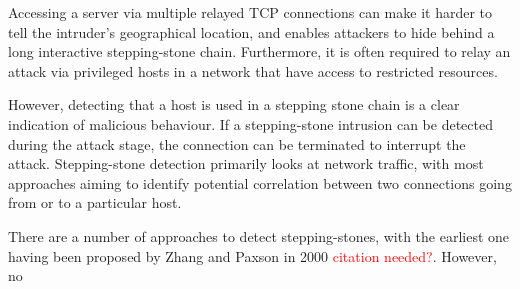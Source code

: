 \documentclass[conference]{IEEEtran}\usepackage[]{graphicx}\usepackage[]{color}
\begin{document}
Accessing a server via multiple relayed TCP connections can make it harder to tell the intruder’s geographical location, and enables attackers to hide behind a long interactive stepping-stone chain. Furthermore, it is often required to relay an attack via privileged hosts in a network that have access to restricted resources. 

However, detecting that a host is used in a stepping stone chain is a clear indication of malicious behaviour. If a stepping-stone intrusion can be detected during the attack stage, the connection can be terminated to interrupt the attack. Stepping-stone detection primarily looks at network traffic, with most approaches aiming to identify potential correlation between two connections going from or to a particular host. 

There are a number of approaches to detect stepping-stones, with the earliest one having been proposed by Zhang and Paxson in 2000 \textcolor{red}{citation needed?}. However, no 
\end{document}
